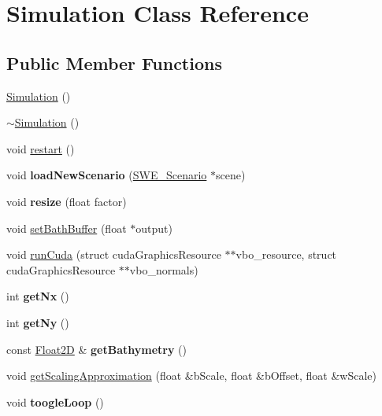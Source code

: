 \hypertarget{classSimulation}{\section{Simulation Class Reference}
\label{classSimulation}
}
\subsection*{Public Member Functions}
\begin{DoxyCompactItemize}
\item 
\hyperlink{classSimulation_a5b224cc5b36bcc8eb29689aff223de41}{Simulation} ()
\item 
\hyperlink{classSimulation_a80fad3f57dfaf195a36f7bc49bc88279}{$\sim$\-Simulation} ()
\item 
void \hyperlink{classSimulation_a6be9990c6b2e31959254c8aa7b6df8a1}{restart} ()
\item 
\hypertarget{classSimulation_a0d9c93f7fbb498ac6f84d22baab8bbb0}{void {\bfseries load\-New\-Scenario} (\hyperlink{classSWE__Scenario}{S\-W\-E\-\_\-\-Scenario} $\ast$scene)}\label{classSimulation_a0d9c93f7fbb498ac6f84d22baab8bbb0}

\item 
\hypertarget{classSimulation_a349cba71f66fac2a159e3517ae7327ab}{void {\bfseries resize} (float factor)}\label{classSimulation_a349cba71f66fac2a159e3517ae7327ab}

\item 
void \hyperlink{classSimulation_a3d8e72877a4c982eaead748b8f8faf36}{set\-Bath\-Buffer} (float $\ast$output)
\item 
void \hyperlink{classSimulation_ab49e788b7f797a1bebdb3f5667cc95b9}{run\-Cuda} (struct cuda\-Graphics\-Resource $\ast$$\ast$vbo\-\_\-resource, struct cuda\-Graphics\-Resource $\ast$$\ast$vbo\-\_\-normals)
\item 
\hypertarget{classSimulation_a3e99b3b75a733fe887f1ea60307af78e}{int {\bfseries get\-Nx} ()}\label{classSimulation_a3e99b3b75a733fe887f1ea60307af78e}

\item 
\hypertarget{classSimulation_a58809b28521e41ba4b853cbf49dcd5a6}{int {\bfseries get\-Ny} ()}\label{classSimulation_a58809b28521e41ba4b853cbf49dcd5a6}

\item 
\hypertarget{classSimulation_a54ff6716f1d6d7a7627ee31062afa2c2}{const \hyperlink{classFloat2D}{Float2\-D} \& {\bfseries get\-Bathymetry} ()}\label{classSimulation_a54ff6716f1d6d7a7627ee31062afa2c2}

\item 
void \hyperlink{classSimulation_aeb1357e23e68821bb27922f3c97b04c2}{get\-Scaling\-Approximation} (float \&b\-Scale, float \&b\-Offset, float \&w\-Scale)
\item 
\hypertarget{classSimulation_a60120697b4c33d63ed3226f30683f207}{void {\bfseries toogle\-Loop} ()}\label{classSimulation_a60120697b4c33d63ed3226f30683f207}

\end{DoxyCompactItemize}


